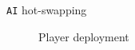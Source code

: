 \documentclass{beamer}
\begin{document}
\begin{frame}{\texttt{AI} hot-swapping}
\begin{figure}[H]
\caption{Player deployment}
\end{figure}
\end{frame}
\end{document}
